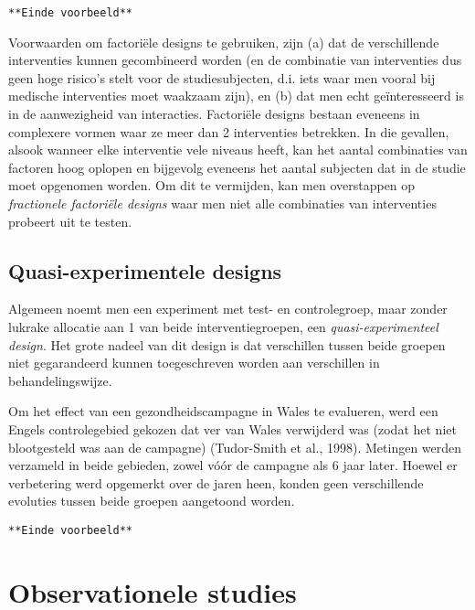\documentclass[12pt,dutch,coursenotes]{book}
\theoremstyle{definition}
\theoremstyle{definition}
\theoremstyle{definition}
\theoremstyle{remark}
\let\BeginKnitrBlock\begin \let\EndKnitrBlock\end
\begin{document}
\texttt{**Einde\ voorbeeld**}

Voorwaarden om factoriële designs te gebruiken, zijn (a) dat de
verschillende interventies kunnen gecombineerd worden (en de combinatie
van interventies dus geen hoge risico's stelt voor de studiesubjecten,
d.i. iets waar men vooral bij medische interventies moet waakzaam zijn),
en (b) dat men echt geïnteresseerd is in de aanwezigheid van
interacties. Factoriële designs bestaan eveneens in complexere vormen
waar ze meer dan 2 interventies betrekken. In die gevallen, alsook
wanneer elke interventie vele niveaus heeft, kan het aantal combinaties
van factoren hoog oplopen en bijgevolg eveneens het aantal subjecten dat
in de studie moet opgenomen worden. Om dit te vermijden, kan men
overstappen op \emph{fractionele factoriële designs} waar men niet alle
combinaties van interventies probeert uit te testen.

\subsection{Quasi-experimentele
designs}\label{quasi-experimentele-designs}

Algemeen noemt men een experiment met test- en controlegroep, maar
zonder lukrake allocatie aan 1 van beide interventiegroepen, een
\emph{quasi-experimenteel design}. Het grote nadeel van dit design is
dat verschillen tussen beide groepen niet gegarandeerd kunnen
toegeschreven worden aan verschillen in behandelingswijze.

\BeginKnitrBlock{example}[Gezondheidscampagne in Wales]
\protect\hypertarget{exm:unnamed-chunk-27}{}{\label{exm:unnamed-chunk-27}
\iffalse (Gezondheidscampagne in Wales) \fi{} }
\EndKnitrBlock{example}

Om het effect van een gezondheidscampagne in Wales te evalueren, werd
een Engels controlegebied gekozen dat ver van Wales verwijderd was
(zodat het niet blootgesteld was aan de campagne) (Tudor-Smith et al.,
1998). Metingen werden verzameld in beide gebieden, zowel vóór de
campagne als 6 jaar later. Hoewel er verbetering werd opgemerkt over de
jaren heen, konden geen verschillende evoluties tussen beide groepen
aangetoond worden.

\texttt{**Einde\ voorbeeld**}

\section{Observationele studies}\label{sec:observational}
\end{document}

